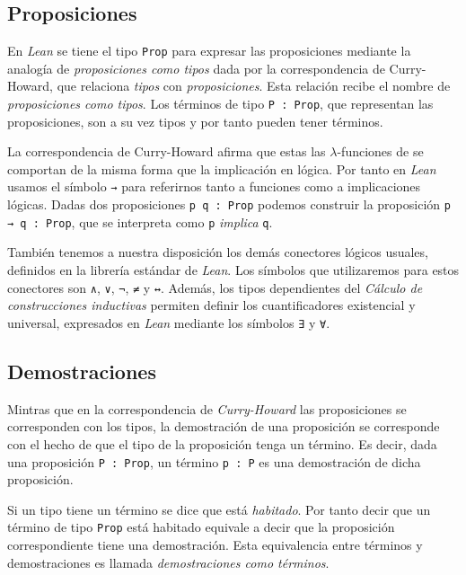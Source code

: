 \subsection{Proposiciones}

En \textit{Lean} se tiene el tipo \lstinline{Prop} para expresar las
proposiciones mediante la analogía de \textit{proposiciones como tipos} dada por
la correspondencia de Curry-Howard, que relaciona \textit{tipos} con
\textit{proposiciones}. Esta relación recibe el nombre de \textit{proposiciones
	como tipos}. Los términos de tipo \lstinline{P : Prop}, que representan las
proposiciones, son a su vez tipos y por tanto pueden tener términos.

La correspondencia de Curry-Howard afirma que estas las $\lambda$-funciones de
se comportan de la misma forma que la implicación en lógica.
Por tanto en \textit{Lean} usamos el símbolo \lstinline{→} para referirnos tanto a
funciones como a implicaciones lógicas. Dadas dos
proposiciones \lstinline{p q : Prop} podemos construir la proposición
\lstinline{p → q : Prop}, que se interpreta como \lstinline{p} \textit{implica}
\lstinline{q}.


También tenemos a nuestra disposición los demás conectores lógicos usuales,
definidos en la librería estándar de \textit{Lean}. Los símbolos que
utilizaremos para estos conectores son \lstinline{∧}, \lstinline{∨},
\lstinline{¬}, \lstinline{≠} y \lstinline{↔}. Además, los tipos dependientes del
\textit{Cálculo de construcciones inductivas} permiten definir los
cuantificadores existencial y universal, expresados en \textit{Lean} mediante
los símbolos \lstinline{∃} y \lstinline{∀}.

\subsection{Demostraciones}

Mintras que en la correspondencia de \textit{Curry-Howard} las proposiciones se
corresponden con los tipos, la demostración de una proposición se corresponde
con el hecho de que el tipo de la proposición tenga un término. Es decir, dada
una proposición \lstinline{P : Prop}, un término \lstinline{p : P} es una
demostración de dicha proposición.

Si un tipo tiene un término se dice que está \textit{habitado}. Por tanto decir
que un término de tipo \lstinline{Prop} está habitado equivale a decir que la
proposición correspondiente tiene una demostración. Esta equivalencia entre
términos y demostraciones es llamada \textit{demostraciones como términos}.

